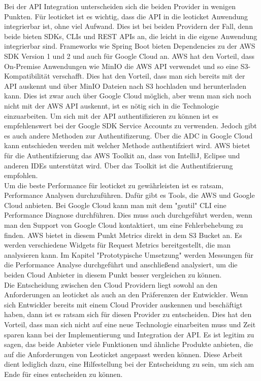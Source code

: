 Bei der API Integration unterscheiden sich die beiden Provider in wenigen Punkten. Für leoticket ist es wichtig, dass die API in die leoticket Anwendung integrierbar ist, ohne viel Aufwand. Dies ist bei beiden Providern der Fall, denn beide bieten SDKs, CLIs und REST APIs an, die leicht in die eigene Anwendung integrierbar sind. Frameworks wie Spring Boot bieten Dependencies zu der AWS SDK Version 1 und 2 und auch für Google Cloud an. AWS hat den Vorteil, dass On-Premise Anwendungen wie MinIO die AWS API verwendet und so eine S3-Kompatibilität verschafft. Dies hat den Vorteil, dass man sich bereits mit der API auskennt und über MinIO Dateien nach S3 hochladen und herunterladen kann. Dies ist zwar auch über Google Cloud möglich, aber wenn man sich noch nicht mit der AWS API auskennt, ist es nötig sich in die Technologie einzuarbeiten. Um sich mit der API authentifizieren zu können ist es empfehlenswert bei der Google SDK Service Accounts zu verwenden. Jedoch gibt es auch andere Methoden zur Authentifizerung.  Über die ADC in Google Cloud kann entschieden werden mit welcher Methode authentifziert wird. AWS bietet für die Authentifzierung das \glqq AWS Toolkit \grqq an, dass von IntelliJ, Eclipse und anderen IDEs unterstützt wird. Über das Toolkit ist die Authentifzierung empfohlen.\\

Um die beste Performance für leoticket zu gewährleisten ist es ratsam, Performance Analysen durchzuführen. Dafür gibt es Tools, die AWS und Google Cloud anbieten. Bei Google Cloud kann man mit dem "gsutil" CLI eine Performance Diagnose durchführen. Dies muss auch durchgeführt werden, wenn man den Support von Google Cloud kontaktiert, um eine Fehlerbehebung zu finden. AWS bietet in diesem Punkt Metrics direkt in dem S3 Bucket an. Es werden verschiedene Widgets für Request Metrics bereitgestellt, die man analysieren kann. Im Kapitel "Prototypische Umsetzung" werden Messungen für die Performance Analyse durchgeführt und anschließend analysiert, um die beiden Cloud Anbieter in diesem Punkt besser vergleichen zu können.\\ 

Die Entscheidung zwischen den Cloud Providern liegt sowohl an den Anforderungen an leoticket als auch an den Präferenzen der Entwickler. Wenn sich Entwickler bereits mit einem Cloud Provider auskennen und beschäftigt haben, dann ist es ratsam sich für diesen Provider zu entscheiden. Dies hat den Vorteil, dass man sich nicht auf eine neue Technologie einarbeiten muss und Zeit sparen kann bei der Implementierung und Integration der API. Es ist legitim zu sagen, das beide Anbieter viele Funktionen und ähnliche Produkte anbieten, die auf die Anforderungen von Leoticket angepasst werden können. Diese Arbeit dient lediglich dazu, eine Hilfestellung bei der Entscheidung zu sein, um sich am Ende für eines entscheiden zu können. 

